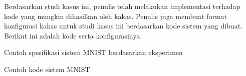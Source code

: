 Berdasarkan studi kasus ini, penulis telah melakukan implementasi terhadap kode yang mungkin dihasilkan oleh kakas.
Penulis juga membuat format konfigurasi kakas untuk studi kasus ini berdasarkan kode sistem yang dibuat.
Berikut ini adalah kode serta konfigurasinya.

\begin{listing}[H]
	\caption{Contoh spesifikasi sistem MNIST berdasarkan eksperimen}
	\label{listing:16}
\end{listing}

\begin{listing}[H]
	\caption{Contoh kode sistem MNIST}
	\label{listing:17}
\end{listing}

